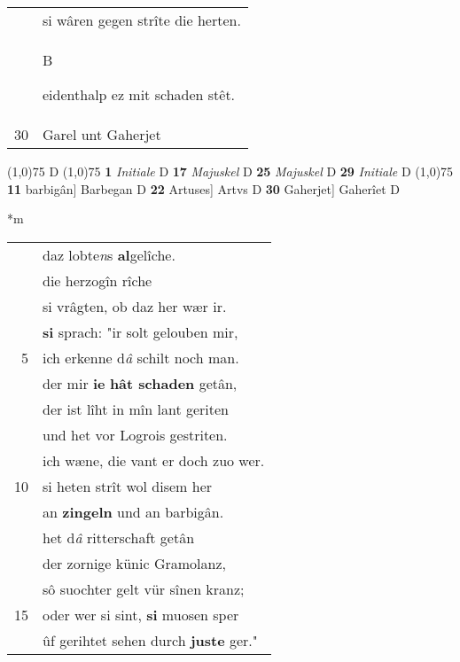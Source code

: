\documentclass[8pt,a4paper,notitlepage]{article}
\begin{document}
\begin{table}[ht]
\begin{minipage}[t]{0.5\linewidth}
\begin{tabular}{rl}
 & si wâren gegen strîte die herten.\\ 
 & \begin{large}B\end{large}eidenthalp ez mit schaden stêt.\\ 
30 & Garel unt Gaherjet\\ 
\end{tabular}
\scriptsize
\line(1,0){75} \newline
D \newline
\line(1,0){75} \newline
\textbf{1} \textit{Initiale} D  \textbf{17} \textit{Majuskel} D  \textbf{25} \textit{Majuskel} D  \textbf{29} \textit{Initiale} D  \newline
\line(1,0){75} \newline
\textbf{11} barbigân] Barbegan D \textbf{22} Artuses] Artvs D \textbf{30} Gaherjet] Gaherîet D \newline
\end{minipage}
\hspace{0.5cm}
\begin{minipage}[t]{0.5\linewidth}
\small
\begin{center}*m
\end{center}
\begin{tabular}{rl}
 & daz lobte\textit{n}s \textbf{al}gelîche.\\ 
 & die herzogîn rîche\\ 
 & si vrâgten, ob daz her wær ir.\\ 
 & \textbf{si} sprach: "ir solt gelouben mir,\\ 
5 & ich erkenne d\textit{â} schilt noch man.\\ 
 & der mir \textbf{ie} \textbf{hât schaden} getân,\\ 
 & der ist lîht in mîn lant geriten\\ 
 & und het vor Logrois gestriten.\\ 
 & ich wæne, die vant er doch zuo wer.\\ 
10 & si heten strît wol disem her\\ 
 & an \textbf{zingeln} und an barbigân.\\ 
 & het d\textit{â} ritterschaft getân\\ 
 & der zornige künic Gramolanz,\\ 
 & sô suochter gelt vür sînen kranz;\\ 
15 & oder wer si sint, \textbf{si} muosen sper\\ 
 & ûf gerihtet sehen durch \textbf{juste} ger."\\ 

\end{tabular}
\end{minipage}
\end{table}
\end{document}
